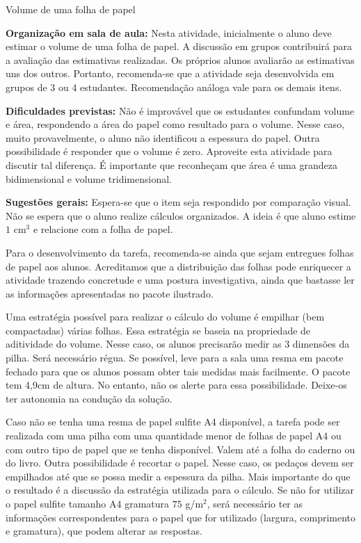 \begin{sugestions}{Volume de uma folha de papel}
{
\textbf{Organização em sala de aula:} Nesta atividade, inicialmente o aluno deve estimar o volume de uma folha de papel. A discussão em grupos contribuirá para a avaliação das estimativas realizadas. Os próprios alunos avaliarão as estimativas uns dos outros. Portanto, recomenda-se que a atividade seja desenvolvida em grupos de 3 ou 4 estudantes. Recomendação análoga vale para os demais itens.

\textbf{Dificuldades previstas:} Não é improvável que os estudantes confundam volume e área, respondendo a área do papel como resultado para o volume. Nesse caso, muito provavelmente, o aluno não identificou a espessura do papel. Outra possibilidade é responder que o volume é zero. Aproveite esta atividade para discutir tal diferença. É importante que reconheçam que área é uma grandeza bidimensional e volume tridimensional.

\textbf{Sugestões gerais:} Espera-se que o item  seja respondido por comparação visual. Não se espera que o aluno realize cálculos organizados. A ideia é que aluno estime \(1\) cm$^3$ e relacione com a folha de papel.

Para o desenvolvimento da tarefa, recomenda-se ainda que sejam entregues folhas de papel aos alunos. Acreditamos que a distribuição das folhas pode enriquecer a atividade trazendo concretude e uma postura investigativa, ainda que bastasse ler as informações apresentadas no pacote ilustrado.

Uma estratégia possível para realizar o cálculo do volume é empilhar (bem compactadas) várias folhas. Essa estratégia se baseia na propriedade de aditividade do volume. Nesse caso, os alunos precisarão medir as 3 dimensões da pilha. Será necessário régua. Se possível, leve para a sala uma resma em pacote fechado para que os alunos possam obter tais medidas mais facilmente. O pacote tem 4,9cm de altura. No entanto, não os alerte para essa possibilidade. Deixe-os ter autonomia na condução da solução.

Caso não se tenha uma resma de papel sulfite A4 disponível, a tarefa pode ser realizada com uma pilha com uma quantidade menor de folhas de papel A4 ou com outro tipo de papel que se tenha disponível. Valem até a folha do caderno ou do livro. Outra possibilidade é recortar o papel. Nesse caso, os pedaços devem ser empilhados até que se possa medir a espessura da pilha. Mais importante do que o resultado é a discussão da estratégia utilizada para o cálculo. Se não for utilizar o papel sulfite tamanho A4 \textendash{} gramatura \(75\) g/m$^2$, será necessário ter as informações correspondentes para o papel que for utilizado (largura, comprimento e gramatura), que podem alterar as respostas.

}
\end{sugestions}
